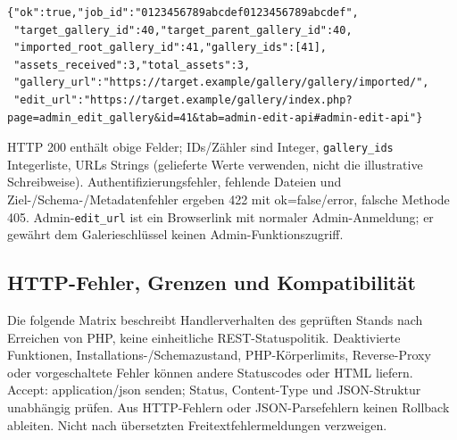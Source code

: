 \documentclass[11pt,a4paper]{article}
\newcommand{\codeword}[1]{\nolinkurl{#1}}
\begin{document}
\begin{lstlisting}[language={}]
{"ok":true,"job_id":"0123456789abcdef0123456789abcdef",
 "target_gallery_id":40,"target_parent_gallery_id":40,
 "imported_root_gallery_id":41,"gallery_ids":[41],
 "assets_received":3,"total_assets":3,
 "gallery_url":"https://target.example/gallery/gallery/imported/",
 "edit_url":"https://target.example/gallery/index.php?page=admin_edit_gallery&id=41&tab=admin-edit-api#admin-edit-api"}
\end{lstlisting}

HTTP 200 enthält obige Felder; IDs/Zähler sind Integer, \codeword{gallery_ids} Integerliste,
URLs Strings (gelieferte Werte verwenden, nicht die illustrative Schreibweise).
Authentifizierungsfehler, fehlende Dateien und Ziel-/Schema-/Metadatenfehler ergeben 422 mit
ok=false/error, falsche Methode 405. Admin-\codeword{edit_url} ist ein Browserlink mit
normaler Admin-Anmeldung; er gewährt dem Galerieschlüssel keinen Admin-Funktionszugriff.

\subsection{\texorpdfstring{HTTP-Fehler, Grenzen und Kompatibilität}{HTTP-Fehler, Grenzen und Kompatibilität}}

\label{api352:errors}

Die folgende Matrix beschreibt Handlerverhalten des geprüften Stands nach Erreichen von PHP,
keine einheitliche REST-Statuspolitik. Deaktivierte Funktionen,
Installations-/Schemazustand, PHP-Körperlimits, Reverse-Proxy oder vorgeschaltete Fehler
können andere Statuscodes oder HTML liefern. Accept: application/json senden; Status,
Content-Type und JSON-Struktur unabhängig prüfen. Aus HTTP-Fehlern oder JSON-Parsefehlern
keinen Rollback ableiten. Nicht nach übersetzten Freitextfehlermeldungen verzweigen.
\end{document}
